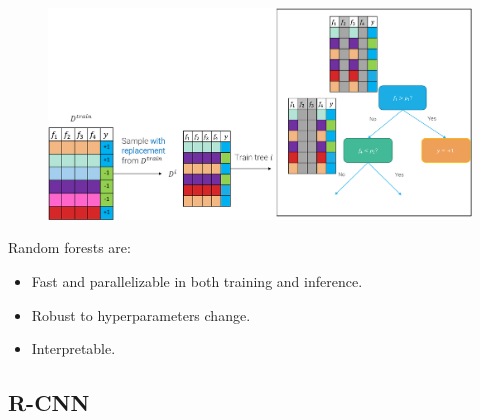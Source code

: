 \begin{description}
\begin{description}
\begin{description}
                        \begin{figure}[H]
                            \raggedleft
                            \includegraphics[width=0.7\linewidth]{./img/_random_forest_random_splitting.pdf}
                        \end{figure}
                \end{description}

                \begin{remark}
                    Random forests are:
                    \begin{itemize}
                        \item Fast and parallelizable in both training and inference.
                        \item Robust to hyperparameters change.
                        \item Interpretable.
                    \end{itemize}
                \end{remark}
        \end{description}
\end{description}


\subsection{R-CNN}

